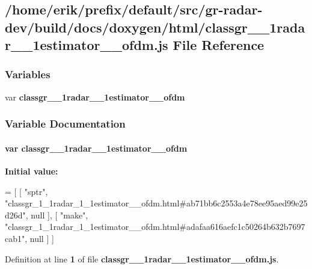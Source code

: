 \subsection{/home/erik/prefix/default/src/gr-\/radar-\/dev/build/docs/doxygen/html/classgr\+\_\+\_\+1radar\+\_\+\_\+1estimator\+\_\+\+\_\+ofdm.js File Reference}
\label{classgr__1__1radar__1__1estimator____ofdm_8js}
\subsubsection*{Variables}
\begin{DoxyCompactItemize}
\item 
var {\bf classgr\+\_\+\_\+1radar\+\_\+\_\+1estimator\+\_\+\+\_\+ofdm}
\end{DoxyCompactItemize}


\subsubsection{Variable Documentation}
\paragraph[{classgr\+\_\+1\+\_\+1radar\+\_\+1\+\_\+1estimator\+\_\+\+\_\+ofdm}]{\setlength{\rightskip}{0pt plus 5cm}var classgr\+\_\+\_\+1radar\+\_\+\_\+1estimator\+\_\+\+\_\+ofdm}\label{classgr__1__1radar__1__1estimator____ofdm_8js_a3d0e3dc8a1b6b40e154cb8551ae079da}
{\bfseries Initial value\+:}
\begin{DoxyCode}
=
[
    [ \textcolor{stringliteral}{"sptr"}, \textcolor{stringliteral}{"classgr\_1\_1radar\_1\_1estimator\_\_ofdm.html#ab71bb6c2553a4e78ee95aed99e25d26d"}, null ],
    [ \textcolor{stringliteral}{"make"}, \textcolor{stringliteral}{"classgr\_1\_1radar\_1\_1estimator\_\_ofdm.html#adafaa616aefc1c50264b632b7697cab1"}, null ]
]
\end{DoxyCode}


Definition at line {\bf 1} of file {\bf classgr\+\_\+\_\+1radar\+\_\+\_\+1estimator\+\_\+\+\_\+ofdm.\+js}.

